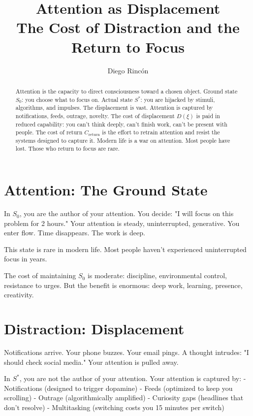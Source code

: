 \documentclass[12pt]{article}
\title{Attention as Displacement\\
The Cost of Distraction and the Return to Focus}
\author{Diego Rincón}
\date{}
\begin{document}
\maketitle

\begin{abstract}
Attention is the capacity to direct consciousness toward a chosen object. Ground state $S_0$: you choose what to focus on. Actual state $S^*$: you are hijacked by stimuli, algorithms, and impulses. The displacement is vast. Attention is captured by notifications, feeds, outrage, novelty. The cost of displacement $D(\xi)$ is paid in reduced capability: you can't think deeply, can't finish work, can't be present with people. The cost of return $C_{\text{return}}$ is the effort to retrain attention and resist the systems designed to capture it. Modern life is a war on attention. Most people have lost. Those who return to focus are rare.
\end{abstract}

\section{Attention: The Ground State}

In $S_0$, you are the author of your attention. You decide: "I will focus on this problem for 2 hours." Your attention is steady, uninterrupted, generative. You enter flow. Time disappears. The work is deep.

This state is rare in modern life. Most people haven't experienced uninterrupted focus in years.

The cost of maintaining $S_0$ is moderate: discipline, environmental control, resistance to urges. But the benefit is enormous: deep work, learning, presence, creativity.

\section{Distraction: Displacement}

Notifications arrive. Your phone buzzes. Your email pings. A thought intrudes: "I should check social media." Your attention is pulled away.

In $S^*$, you are not the author of your attention. Your attention is captured by:
- Notifications (designed to trigger dopamine)
- Feeds (optimized to keep you scrolling)
- Outrage (algorithmically amplified)
- Curiosity gaps (headlines that don't resolve)
- Multitasking (switching costs you 15 minutes per switch)
\end{document}
